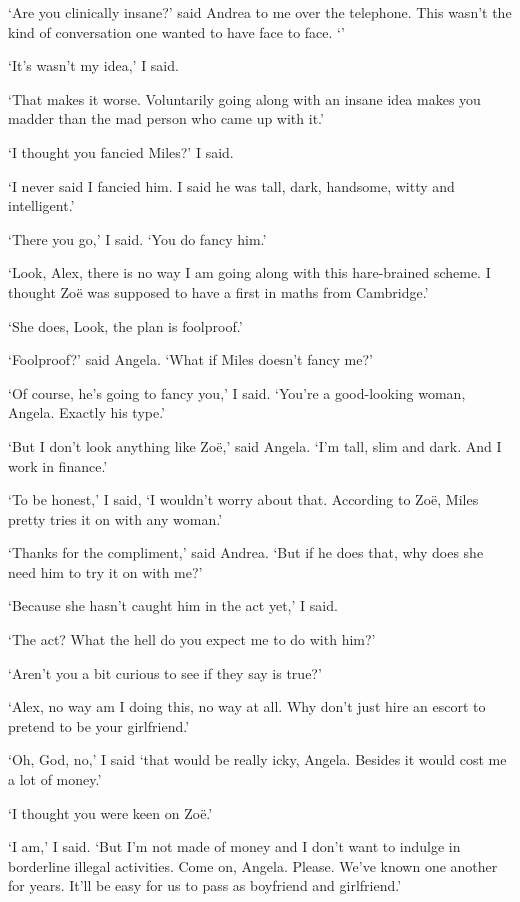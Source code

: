 `Are you clinically insane?' said Andrea to me over the telephone.
This wasn't the kind of conversation one wanted to have face to
face. `'

`It's wasn't my idea,' I said.

`That makes it worse. Voluntarily going along with an insane idea
makes you madder than the mad person who came up with it.'

`I thought you fancied Miles?' I said.

`I never said I fancied him. I said he was tall, dark, handsome,
witty and intelligent.'

`There you go,' I said. `You {\twelveit do\/} fancy him.'

`Look, Alex, there is no way I am going along with this hare-brained
scheme. I thought Zo{\"e} was supposed to have a first in maths from
Cambridge.'

`She does, Look, the plan is foolproof.'

`Foolproof?' said Angela. `What if Miles doesn't fancy me?'

`Of course, he's going to fancy you,' I said. `You're a good-looking
woman, Angela. Exactly his type.'

`But I don't look anything like Zo{\"e},' said Angela. `I'm tall,
slim and dark. And I work in finance.'

`To be honest,' I said, `I wouldn't worry about that. According to
Zo{\"e}, Miles pretty tries it on with any woman.'

`Thanks for the compliment,' said Andrea. `But if he does that, why
does she need him to try it on with me?'

`Because she hasn't caught him in the act yet,' I said.

`The act? What the hell do you expect me to do with him?'

`Aren't you a bit curious to see if they say is true?'

`Alex, no way am I doing this, no way at all. Why don't just hire an
escort to pretend to be your girlfriend.'

`Oh, God, no,' I said `that would be really icky, Angela. Besides it
would cost me a lot of money.'

`I thought you were keen on Zo{\"e}.'

`I am,' I said. `But I'm not made of money and I don't want to indulge in borderline illegal activities. Come on, Angela. Please. We've known one another
for years. It'll be easy for us to pass as boyfriend and
girlfriend.'

